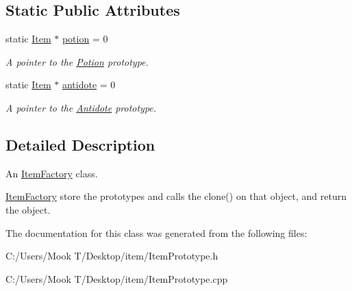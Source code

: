 \subsection*{Static Public Attributes}
\begin{DoxyCompactItemize}
\item 
\hypertarget{class_item_factory_a26325ba5225e258360465076f44a8c6c}{}static \hyperlink{class_item}{Item} $\ast$ \hyperlink{class_item_factory_a26325ba5225e258360465076f44a8c6c}{potion} = 0\label{class_item_factory_a26325ba5225e258360465076f44a8c6c}

\begin{DoxyCompactList}\small\item\em A pointer to the \hyperlink{class_potion}{Potion} prototype. \end{DoxyCompactList}\item 
\hypertarget{class_item_factory_aa4b3dbb8ff64d34373907c78a5c6787c}{}static \hyperlink{class_item}{Item} $\ast$ \hyperlink{class_item_factory_aa4b3dbb8ff64d34373907c78a5c6787c}{antidote} = 0\label{class_item_factory_aa4b3dbb8ff64d34373907c78a5c6787c}

\begin{DoxyCompactList}\small\item\em A pointer to the \hyperlink{class_antidote}{Antidote} prototype. \end{DoxyCompactList}\end{DoxyCompactItemize}


\subsection{Detailed Description}
An \hyperlink{class_item_factory}{Item\+Factory} class. 

\hyperlink{class_item_factory}{Item\+Factory} store the prototypes and calls the clone() on that object, and return the object. 

The documentation for this class was generated from the following files\+:\begin{DoxyCompactItemize}
\item 
C\+:/\+Users/\+Mook T/\+Desktop/item/Item\+Prototype.\+h\item 
C\+:/\+Users/\+Mook T/\+Desktop/item/Item\+Prototype.\+cpp\end{DoxyCompactItemize}
